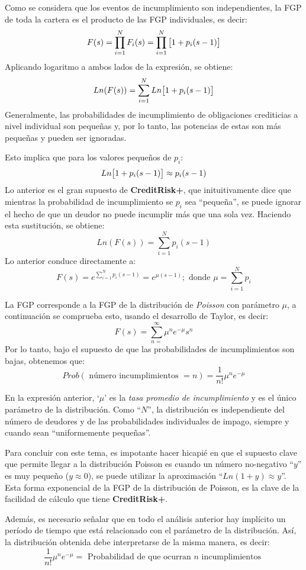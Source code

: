 \documentclass[
  12pt,
]{krantz}
\theoremstyle{definition}
\theoremstyle{definition}
\theoremstyle{definition}
\theoremstyle{remark}
\begin{document}
Como se considera que los eventos de incumplimiento son independientes, la FGP de toda la cartera es el producto de las FGP individuales, es decir:\[F(s)=\prod_{i=1}^NF_i(s)=\prod_{i=1}^N\big{[}1+p_i(s-1)\big{]}\]
Aplicando logaritmo a ambos lados de la expresión, se obtiene:\[Ln(F(s))=\sum_{i=1}^NLn\big{[}1+p_i(s-1)\big{]}\]
Generalmente, las probabilidades de incumplimiento de obligaciones crediticias a nivel individual son pequeñas y, por lo tanto, las potencias de estas son más pequeñas y pueden ser ignoradas.

Esto implica que para los valores pequeños de \(p_i\):\[Ln\big{[}1+p_i(s-1)\big{]}\approx p_i(s-1)\]
Lo anterior es el gran supuesto de \textbf{CreditRisk+}, que inituitivamente dice que mientras la probabilidad de incumplimiento se \(p_i\) sea ``pequeña'', se puede ignorar el hecho de que un deudor no puede incumplir más que una sola vez. Haciendo esta sustitución, se obtiene:\[Ln(F(s))=\sum_{i=1}^Np_i(s-1)\]
Lo anterior conduce directamente a: \[F(s)=e^{\sum_{i=1}^Np_i(s-1)}=e^{\mu(s-1)};\textrm{ donde } \mu=\sum_{i=1}^Np_i\]

La FGP corresponde a la FGP de la distribución de \emph{Poisson} con parámetro \(\mu\), a continuación se comprueba esto, usando el desarrollo de Taylor, es decir:\[F(s)=\sum_{n=}^\infty\mu^ne^{-\mu}s^n\]
Por lo tanto, bajo el supuesto de que las probabilidades de incumplimientos son bajas, obtenemos que:\[Prob(\textrm{ número incumplimientos }=n)=\frac{1}{n!}\mu^ne^{-\mu}\]

En la expresión anterior, `\(\mu\)' es la \emph{tasa promedio de incumplimiento} y es el único parámetro de la distribución. Como ``\(N\)'', la distribución es independiente del número de deudores y de las probabilidades individuales de impago, siempre y cuando sean ``uniformemente pequeñas''.

Para concluir con este tema, es impotante hacer hicapié en que el supuesto clave que permite llegar a la distribución Poisson es cuando un número no-negativo ``\(y\)'' es muy pequeño (\(y\approx 0\)), se puede utilizar la aproximación ``\(Ln(1+y)\approx y\)''. Esta forma exponencial de la FGP de la distribución de Poisson, es la clave de la facilidad de cálculo que tiene \textbf{CreditRisk+}.

Además, es necesario señalar que en todo el análisis anterior hay implícito un período de tiempo que está relacionado con el parámetro de la distribución. Así, la distribución obtenida debe interpretarse de la misma manera, es decir:\[\frac{1}{n!}\mu^ne^{-\mu}=\textrm{ Probabilidad de que ocurran } n \textrm{ incumplimientos }\]
\end{document}
